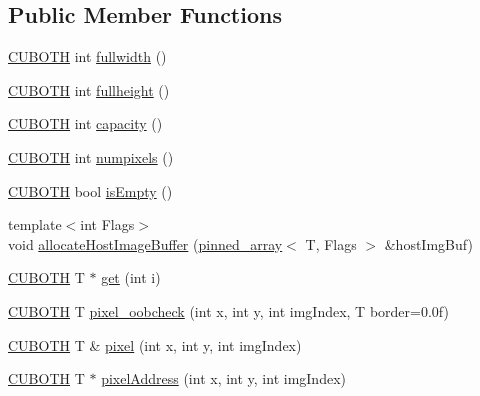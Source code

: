 \subsection*{Public Member Functions}
\begin{DoxyCompactItemize}
\item 
\hyperlink{gpu__utils_8h_ac50b87a58396e77c6168aa6f3be3c189}{C\+U\+B\+O\+TH} int \hyperlink{structcuda_image_list_a4f2cf476a48fe70d5d1849212017883b}{fullwidth} ()
\item 
\hyperlink{gpu__utils_8h_ac50b87a58396e77c6168aa6f3be3c189}{C\+U\+B\+O\+TH} int \hyperlink{structcuda_image_list_abec8121a698e04d7d3afa21b77a673a8}{fullheight} ()
\item 
\hyperlink{gpu__utils_8h_ac50b87a58396e77c6168aa6f3be3c189}{C\+U\+B\+O\+TH} int \hyperlink{structcuda_image_list_a6759021920d3f07b1b46049a3d3ab78e}{capacity} ()
\item 
\hyperlink{gpu__utils_8h_ac50b87a58396e77c6168aa6f3be3c189}{C\+U\+B\+O\+TH} int \hyperlink{structcuda_image_list_a7f29b098dc0916fff9a396c8250c560c}{numpixels} ()
\item 
\hyperlink{gpu__utils_8h_ac50b87a58396e77c6168aa6f3be3c189}{C\+U\+B\+O\+TH} bool \hyperlink{structcuda_image_list_a27f76df59ecf2802d89ce123f21a2780}{is\+Empty} ()
\item 
{\footnotesize template$<$int Flags$>$ }\\void \hyperlink{structcuda_image_list_a1e1ba9d79be0038996d1d4a65042a4db}{allocate\+Host\+Image\+Buffer} (\hyperlink{classpinned__array}{pinned\+\_\+array}$<$ T, Flags $>$ \&host\+Img\+Buf)
\item 
\hyperlink{gpu__utils_8h_ac50b87a58396e77c6168aa6f3be3c189}{C\+U\+B\+O\+TH} T $\ast$ \hyperlink{structcuda_image_list_a5e6745abe38ecdfab4b5e9913e26c952}{get} (int i)
\item 
\hyperlink{gpu__utils_8h_ac50b87a58396e77c6168aa6f3be3c189}{C\+U\+B\+O\+TH} T \hyperlink{structcuda_image_list_a12659cbcf3d4801ea8e6c354efd58baa}{pixel\+\_\+oobcheck} (int x, int y, int img\+Index, T border=0.\+0f)
\item 
\hyperlink{gpu__utils_8h_ac50b87a58396e77c6168aa6f3be3c189}{C\+U\+B\+O\+TH} T \& \hyperlink{structcuda_image_list_a3688416d9034449c1493e593c8456eb2}{pixel} (int x, int y, int img\+Index)
\item 
\hyperlink{gpu__utils_8h_ac50b87a58396e77c6168aa6f3be3c189}{C\+U\+B\+O\+TH} T $\ast$ \hyperlink{structcuda_image_list_aab7ac2329d20752d4364c87a21d76092}{pixel\+Address} (int x, int y, int img\+Index)
\item 

\end{DoxyCompactItemize}
